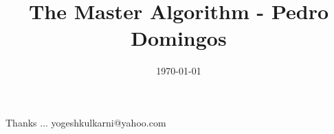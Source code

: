 \documentclass[xcolor=dvipsnames,compress,t,pdf]{beamer}
\title[Zen Habits \hspace{4cm} \insertframenumber /\inserttotalframenumber]
{The Master Algorithm - Pedro Domingos}
\subtitle[]{}
\date[2014]{\today}
\begin{document}
\begin{frame}
\titlepage
\end{frame}




\begin{frame}[c]{}
Thanks ...
\vspace{5mm}
yogeshkulkarni@yahoo.com
\end{frame}
\end{document}
